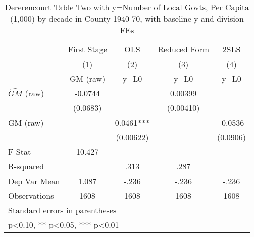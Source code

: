 \begin{table}[htbp]\centering
\def\sym#1{\ifmmode^{#1}\else\(^{#1}\)\fi}
\caption{Dererencourt Table Two with y=Number of Local Govts, Per Capita (1,000) by decade in County 1940-70, with baseline y and division FEs}
\begin{tabular}{l*{4}{c}}
\toprule
                    & First Stage   &         OLS   &Reduced Form   &        2SLS   \\
                    &\multicolumn{1}{c}{(1)}&\multicolumn{1}{c}{(2)}&\multicolumn{1}{c}{(3)}&\multicolumn{1}{c}{(4)}\\
                    &\multicolumn{1}{c}{GM  (raw)}&\multicolumn{1}{c}{y\_L0}&\multicolumn{1}{c}{y\_L0}&\multicolumn{1}{c}{y\_L0}\\
\midrule
$\hat{GM}$ (raw)    &     -0.0744   &               &     0.00399   &               \\
                    &    (0.0683)   &               &   (0.00410)   &               \\
\addlinespace
GM  (raw)           &               &      0.0461***&               &     -0.0536   \\
                    &               &   (0.00622)   &               &    (0.0906)   \\
\midrule
F-Stat              &      10.427   &               &               &               \\
R-squared           &               &        .313   &        .287   &               \\
Dep Var Mean        &       1.087   &       -.236   &       -.236   &       -.236   \\
Observations        &        1608   &        1608   &        1608   &        1608   \\
\bottomrule
\multicolumn{5}{l}{\footnotesize Standard errors in parentheses}\\
\multicolumn{5}{l}{\footnotesize * p<0.10, ** p<0.05, *** p<0.01}\\
\end{tabular}
\end{table}
